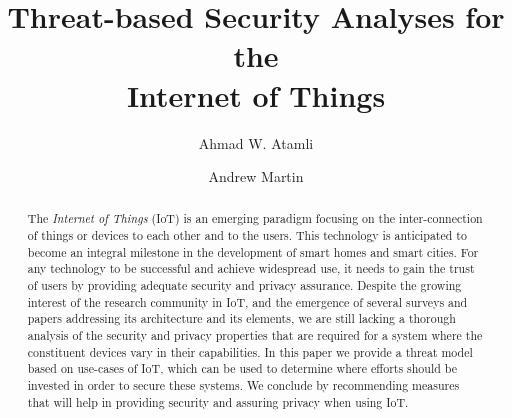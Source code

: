 \documentclass{llncs}
\begin{document}
\title{Threat-based Security Analyses for the \\Internet of Things}




\author{Ahmad W. Atamli \and Andrew Martin}







\maketitle

\begin{abstract}

The \textit{Internet of Things} (IoT) is an emerging paradigm focusing on the inter-connection of things or devices to each other and to the users. This technology is anticipated to become an integral milestone in the development of smart homes and smart cities. For any technology to be successful and achieve widespread use, it needs to gain the trust of users by providing adequate security and privacy assurance. Despite the growing interest of the research community in IoT, and the emergence of several surveys and papers addressing its architecture and its elements, we are still lacking a thorough analysis of the security and privacy properties that are required for a system where the constituent devices vary in their capabilities. In this paper we provide a threat model based on use-cases of IoT, which can be used to determine where efforts should be invested in order to secure these systems. We conclude by recommending measures that will help in providing security and assuring privacy when using IoT. 

\end{abstract}
\end{document}
